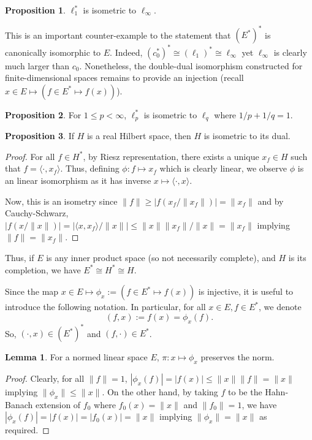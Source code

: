 \documentclass[]{article}
\theoremstyle{definition}
\theoremstyle{definition}
\newtheorem{lemma}{Lemma}[section]
\newtheorem{proposition}{Proposition}[section]
\begin{document}
\begin{proposition}
  \(\ell_1^*\) is isometric to \(\ell_\infty\).
\end{proposition}

This is an important counter-example to the statement that \((E^*)^*\) is 
canonically isomorphic to \(E\). Indeed, \((c_0^*)^* \cong (\ell_1)^* \cong \ell_\infty\)
yet \(\ell_\infty\) is clearly much larger than \(c_0\). Nonetheless, the 
double-dual isomorphism constructed for finite-dimensional spaces remains to 
provide an injection (recall \(x \in E \mapsto (f \in E^* \mapsto f(x))\)). 

\begin{proposition}\label{dual_lp}
  For \(1 \le p < \infty\), \(\ell_p^*\) is isometric to \(\ell_q\) where 
  \(1 / p + 1 / q = 1\).
\end{proposition}

\begin{proposition}
  If \(H\) is a real Hilbert space, then \(H\) is isometric to its dual. 
\end{proposition}
\begin{proof}
  For all \(f \in H^*\), by Riesz representation, there exists a unique \(x_f \in H\) 
  such that \(f = \langle \cdot, x_f \rangle\). Thus, defining 
  \(\phi : f \mapsto x_f\) which is clearly linear, we observe \(\phi\) is 
  an linear isomorphism as it has inverse \(x \mapsto \langle \cdot, x\rangle\).

  Now, this is an isometry since \(\|f\| \ge |f(x_f / \|x_f\|)| = \|x_f\|\) and 
  by Cauchy-Schwarz, \(|f(x / \|x\|)| = |\langle x, x_f \rangle / \|x\|| \le 
  \|x\| \|x_f\| / \|x\| = \|x_f\|\) implying \(\|f\| = \|x_f\|\).
\end{proof}

Thus, if \(E\) is any inner product space (so not necessarily complete), 
and \(H\) is its completion, we have \(E^* \cong H^* \cong H\). 

Since the map \(x \in E \mapsto \phi_x := (f \in E^* \mapsto f(x))\) is 
injective, it is useful to introduce the following notation. In particular, 
for all \(x \in E, f \in E^*\), we denote 
\[(f, x) := f(x) = \phi_x(f).\]
So, \((\cdot, x) \in (E^*)^*\) and \((f, \cdot) \in E^*\).

\begin{lemma}
  For a normed linear space \(E\), \(\pi : x \mapsto \phi_x\) preserves the 
  norm.
\end{lemma}
\begin{proof}
  Clearly, for all \(\|f\| = 1\), \(|\phi_x(f)| = |f(x)| \le \|x\|\|f\| = \|x\|\) 
  implying \(\|\phi_x\| \le \|x\|\). On the other hand, by taking \(f\) to 
  be the Hahn-Banach extension of \(f_0\) where \(f_0(x) = \|x\|\) and 
  \(\|f_0\| = 1\), we have \(|\phi_x(f)| = |f(x)| = |f_0(x)| = \|x\|\) 
  implying \(\|\phi_x\| = \|x\|\) as required. 
\end{proof}
\end{document}

